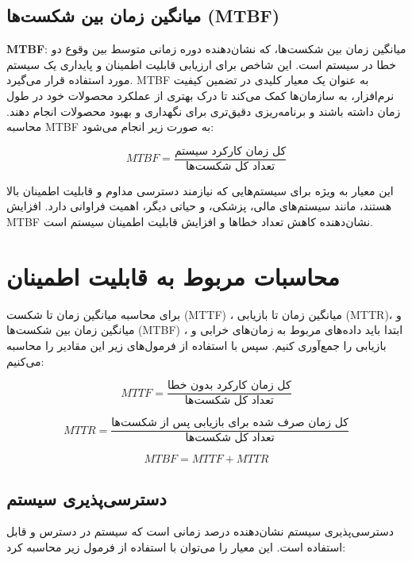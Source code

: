 \subsection*{میانگین زمان بین شکست‌ها (MTBF)}
\textbf{MTBF}: 
میانگین زمان بین شکست‌ها، که نشان‌دهنده دوره زمانی متوسط بین وقوع دو خطا در سیستم است. این شاخص برای ارزیابی قابلیت اطمینان و پایداری یک سیستم مورد استفاده قرار می‌گیرد. MTBF به عنوان یک معیار کلیدی در تضمین کیفیت نرم‌افزار، به سازمان‌ها کمک می‌کند تا درک بهتری از عملکرد محصولات خود در طول زمان داشته باشند و برنامه‌ریزی دقیق‌تری برای نگهداری و بهبود محصولات انجام دهند. محاسبه MTBF به صورت زیر انجام می‌شود:

\begin{equation}
	MTBF = \frac{\text{کل زمان کارکرد سیستم}}{\text{تعداد کل شکست‌ها}}
\end{equation}

این معیار به ویژه برای سیستم‌هایی که نیازمند دسترسی مداوم و قابلیت اطمینان بالا هستند، مانند سیستم‌های مالی، پزشکی، و حیاتی دیگر، اهمیت فراوانی دارد. افزایش MTBF نشان‌دهنده کاهش تعداد خطاها و افزایش قابلیت اطمینان سیستم است.

\section*{محاسبات مربوط به قابلیت اطمینان}

برای محاسبه میانگین زمان تا شکست (MTTF) ، میانگین زمان تا بازیابی (MTTR)، و میانگین زمان بین شکست‌ها (MTBF) ، ابتدا باید داده‌های مربوط به زمان‌های خرابی و بازیابی را جمع‌آوری کنیم. سپس با استفاده از فرمول‌های زیر این مقادیر را محاسبه می‌کنیم:

\begin{equation}
	MTTF = \frac{\text{کل زمان کارکرد بدون خطا}}{\text{تعداد کل شکست‌ها}}
\end{equation}

\begin{equation}
	MTTR = \frac{\text{کل زمان صرف شده برای بازیابی پس از شکست‌ها}}{\text{تعداد کل شکست‌ها}}
\end{equation}

\begin{equation}
	MTBF = MTTF + MTTR
\end{equation}

\subsection*{دسترسی‌پذیری سیستم}
دسترسی‌پذیری سیستم نشان‌دهنده درصد زمانی است که سیستم در دسترس و قابل استفاده است. این معیار را می‌توان با استفاده از فرمول زیر محاسبه کرد:

